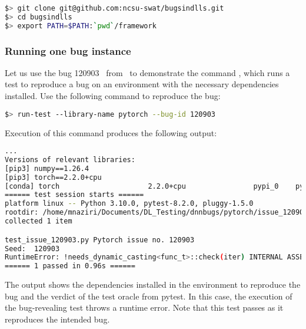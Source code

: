\documentclass[sigconf,screen]{acmart}
\begin{document}
\begin{lstlisting}[language=bash]
$> git clone git@github.com:ncsu-swat/bugsindlls.git
$> cd bugsindlls
$> export PATH=$PATH:`pwd`/framework
\end{lstlisting}


\subsubsection{Running one bug instance}



Let us use the bug 120903~ from \torch\ to demonstrate the
command , which runs a test to reproduce a bug on an
environment with the necessary dependencies installed. Use the
following command to reproduce the bug:

\begin{lstlisting}[language=bash]
$> run-test --library-name pytorch --bug-id 120903
\end{lstlisting}

\noindent
Execution of this command produces the following output:

\begin{lstlisting}[language=bash]
... 
Versions of relevant libraries:
[pip3] numpy==1.26.4
[pip3] torch==2.2.0+cpu
[conda] torch                     2.2.0+cpu                pypi_0    pypi
====== test session starts ======
platform linux -- Python 3.10.0, pytest-8.2.0, pluggy-1.5.0
rootdir: /home/mnaziri/Documents/DL_Testing/dnnbugs/pytorch/issue_120903
collected 1 item                                                                            

test_issue_120903.py Pytorch issue no. 120903
Seed:  120903
RuntimeError: !needs_dynamic_casting<func_t>::check(iter) INTERNAL ASSERT FAILED at "../aten/src/ATen/native/cpu/Loops.h":310, please report a bug to PyTorch. 
====== 1 passed in 0.96s ======
\end{lstlisting}

The output shows the dependencies installed in the environment to
reproduce the bug and the verdict of the test oracle from pytest. In
this case, the execution of the bug-revealing test throws a runtime
error. Note that this test passes as it reproduces the intended bug.

\end{document}
